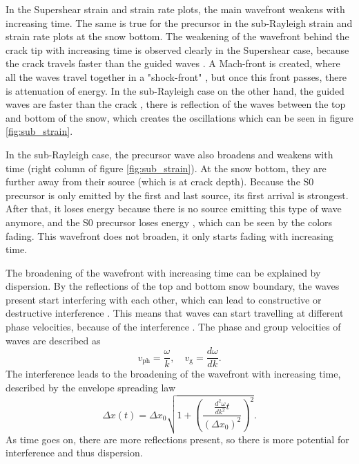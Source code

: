 In the Supershear strain and strain rate plots, the main wavefront weakens with increasing time. The same is true for the precursor in the sub-Rayleigh strain and strain rate plots at the snow bottom. The weakening of the wavefront behind the crack tip with increasing time is observed clearly in the Supershear case, because the crack travels faster than the guided waves \parencite{dunhamNearsourceGroundMotion2005}. A Mach-front is created, where all the waves travel together in a "shock-front" \parencite{dunhamNearsourceGroundMotion2005}, but once this front passes, there is attenuation of energy. In the sub-Rayleigh case on the other hand, the guided waves are faster than the crack \parencite{kAkiRichards19801981}, there is reflection of the waves between the top and bottom of the snow, which creates the oscillations which can be seen in figure \ref{fig:sub_strain}. \par

In the sub-Rayleigh case, the precursor wave also broadens and weakens with time (right column of figure \ref{fig:sub_strain}). At the snow bottom, they are further away from their source (which is at crack depth). Because the S0 precursor is only emitted by the first and last source, its first arrival is strongest. After that, it loses energy because there is no source emitting this type of wave anymore, and the S0 precursor loses energy \parencite{kAkiRichards19801981}, which can be seen by the colors fading. This wavefront does not broaden, it only starts fading with increasing time. \par

The broadening of the wavefront with increasing time can be explained by dispersion. By the reflections of the top and bottom snow boundary, the waves present start interfering with each other, which can lead to constructive or destructive interference \parencite{kAkiRichards19801981}. This means that waves can start travelling at different phase velocities, because of the interference \cite{graffWaveMotionElastic1975}. The phase and group velocities of waves are described as \begin{equation}
v_{\text{ph}} = \frac{\omega}{k}, \quad v_{\text{g}} = \frac{d\omega}{dk}
\label{eq:velocities}.
\end{equation} The interference leads to the broadening of the wavefront with increasing time, described by the envelope spreading law \parencite{kAkiRichards19801981} \begin{equation}
\Delta x(t) = \Delta x_0 \sqrt{1 + \left( \frac{\frac{d^2\omega}{dk^2} t}{(\Delta x_0)^2} \right)^2}
\label{eq:envelope_spreading}.
\end{equation} As time goes on, there are more reflections present, so there is more potential for interference and thus dispersion. \par

